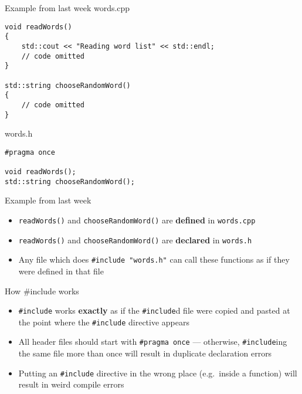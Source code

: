 \begin{frame}[fragile]{Example from last week}
    words.cpp
    \begin{lstlisting}
void readWords()
{
    std::cout << "Reading word list" << std::endl;
    // code omitted
}

std::string chooseRandomWord()
{
    // code omitted
}
    \end{lstlisting}
    
    words.h
    \begin{lstlisting}
#pragma once

void readWords();
std::string chooseRandomWord();
    \end{lstlisting}
\end{frame}

\begin{frame}[fragile]{Example from last week}
    \begin{itemize}
        \item \lstinline{readWords()} and \lstinline{chooseRandomWord()} are \textbf{defined} in \texttt{words.cpp}
        \item \lstinline{readWords()} and \lstinline{chooseRandomWord()} are \textbf{declared} in \texttt{words.h}
        \item Any file which does \lstinline{#include "words.h"} can call these functions as if they were defined in that file
    \end{itemize}
\end{frame}

\begin{frame}[fragile]{How \#include works}
    \begin{itemize}
        \item \lstinline{#include} works \textbf{exactly} as if the \lstinline{#include}d file were copied and pasted
            at the point where the \lstinline{#include} directive appears
        \item All header files should start with \lstinline{#pragma once} --- otherwise,
            \lstinline{#include}ing the same file more than once will result in duplicate declaration errors
        \item Putting an \lstinline{#include} directive in the wrong place (e.g.\ inside a function) will result in
            weird compile errors
    \end{itemize}
\end{frame}
